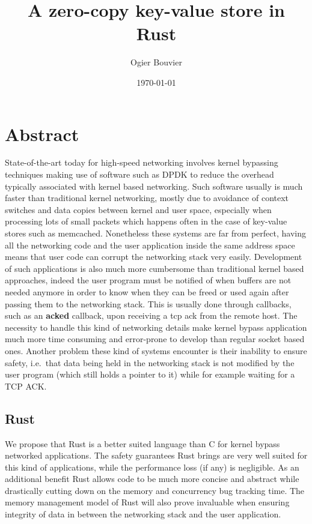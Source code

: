 \documentclass[11pt]{article}
\author{Ogier Bouvier}
\date{\today}
\title{A zero-copy key-value store in Rust}
\begin{document}
\maketitle
\tableofcontents
\newpage

\section{Abstract}
State-of-the-art today for high-speed networking involves kernel
bypassing techniques making use of software such as DPDK to reduce the
overhead typically associated with kernel based networking. Such
software usually is much faster than traditional kernel networking,
mostly due to avoidance of context switches and data copies between
kernel and user space, especially when processing lots of small
packets which  happens often in the case of key-value stores such as
memcached. Nonetheless these systems are far from perfect, having all
the  networking code and the user application inside the same address
space means that user code can corrupt the networking stack very
easily. Development of such applications is also much more cumbersome
than traditional kernel based approaches, indeed the user program must
be notified of when buffers are not needed anymore in order to know
when they can be freed or used again after passing them to the
networking stack. This is usually done through callbacks, such as an
\textbf{acked} callback, upon receiving a tcp ack from the remote
host. The necessity to handle this kind of networking details make
kernel bypass application much more time consuming and error-prone to
develop than regular socket based ones. Another problem these kind of
systems encounter is their inability to ensure safety, i.e.\ that data
being held in the networking stack is not modified by the user program
(which still holds a pointer to it) while for example waiting for a
TCP ACK.

\subsection{Rust}
We propose that Rust is a better suited language than C for kernel
bypass networked applications. The safety guarantees Rust
brings are very well suited for this kind of applications, while the
performance loss (if any) is negligible. As an additional benefit Rust
allows code to be much more concise and abstract while drastically
cutting down on the memory and concurrency bug tracking time. The
memory management model of Rust will also prove invaluable when
ensuring integrity of data in between the networking stack and the
user application.
\end{document}
